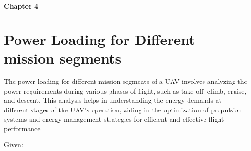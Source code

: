 \documentclass[12 pt]{article}
\begin{document}
\newpage

\newpage
\newpage
\newpage
\newpage

\textbf{\Huge{Chapter 4}}

\section{Power Loading for Different mission segments}
The power loading for different mission segments of a UAV involves analyzing the power requirements during various phases of flight, such as take off, climb, cruise, and descent. This analysis helps in understanding the energy demands at different stages of the UAV's operation, aiding in the optimization of propulsion systems and energy management strategies for efficient and effective flight performance

 Given:
\end{document}
